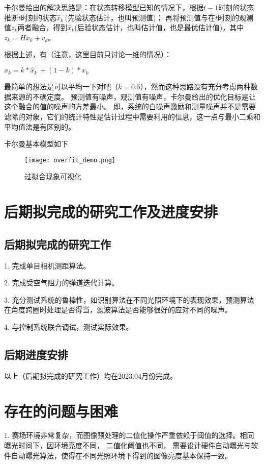卡尔曼给出的解决思路是：在状态转移模型已知的情况下，根据$t-1$时刻的状态推断$t$时刻的状态$\hat{x}_k^{-}$(先验状态估计，也叫预测值)；
再将预测值与在$t$时刻的观测值$z_k$两者融合，得到$\hat{x}_k$(后验状态估计，也叫估计值，也是最优估计值)，其中$z_k=Hx_k+v_k$。\par

根据上述，有（注意，这里目前只讨论一维的情况）： \par
$\hat{x}_k = k*\hat{x}_k^{-} + (1-k)*x_k$

最简单的想法是可以平均一下对吧（$k=0.5$），然而这种思路没有充分考虑两种数据来源的不确定度。
预测值有噪声，观测值有噪声，卡尔曼给出的优化目标是让这个融合的值的噪声的方差最小。
即，系统的白噪声激励和测量噪声并不是需要滤除的对象，它们的统计特性是估计过程中需要利用的信息，这一点与最小二乘和平均值法是有区别的。\par

卡尔曼基本模型如下
\begin{figure}[H]
    \centering
    \texttt{[image: overfit\_demo.png]} 
    \caption{过拟合现象可视化} 
\end{figure} 


\section{后期拟完成的研究工作及进度安排}
\subsection{后期拟完成的研究工作}
1. 完成单目相机测距算法。\par
2. 完成受空气阻力的弹道迭代计算。\par
3. 充分测试系统的鲁棒性，如识别算法在不同光照环境下的表现效果，预测算法在角度跨圈时处理是否得当，滤波算法是否能够很好的应对不同的噪声。\par
4. 与控制系统联合调试，测试实际效果。\par
\subsection{后期进度安排}
以上（后期拟完成的研究工作）均在2023.04月份完成。
\section{存在的问题与困难}
1. 赛场环境非常复杂，而图像预处理的二值化操作严重依赖于阈值的选择。相同曝光时间下，因环境亮度不同， 二值化阈值也不同，
需要设计硬件自动曝光与软件自动曝光算法，使得在不同光照环境下得到的图像亮度基本保持一致。\par

